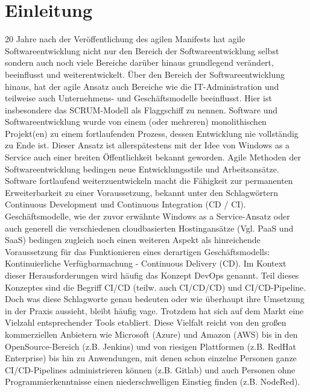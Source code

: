 \section{Einleitung}
\label{Einleitung}
20 Jahre nach der Veröffentlichung des agilen Manifests \cite{eckstein_20_2021} hat agile Softwareentwicklung nicht nur den Bereich der Softwareentwicklung selbst sondern auch noch viele Bereiche darüber hinaus grundlegend verändert, beeinflusst und weiterentwickelt. Über den Bereich der Softwareentwicklung hinaus, hat der agile Ansatz auch Bereiche wie die IT-Administration und teilweise auch Unternehmens- und Geschäftsmodelle beeinflusst. Hier ist insbesondere das \gls{SCRUM}-Modell als Flaggschiff zu nennen.
Software und Softwareentwicklung wurde von einem (oder mehreren) monolithischen Projekt(en) zu einem fortlaufenden Prozess, dessen Entwicklung nie vollständig zu Ende ist. Dieser Ansatz ist allerspätestens mit der Idee von \grqq{}Windows as a Service\glqq{} \cite{jaimeo_kurzanleitung_2021} auch einer breiten Öffentlichkeit bekannt geworden.\newline
Agile Methoden der Softwareentwicklung bedingen neue Entwicklungsstile und Arbeitsansätze. Software fortlaufend weiterzuentwickeln  macht die Fähigkeit zur permanenten Erweiterbarkeit zu einer Voraussetzung, bekannt unter den Schlagwörtern \glqq{} Continuous Development\grqq{} und \glqq{} Continuous Integration\grqq{}  (\acrshort{CD} / \acrshort{CI}). Geschäftsmodelle, wie der zuvor erwähnte \glqq{}Windows as a Service\grqq{}-Ansatz oder auch generell die verschiedenen cloudbasierten Hostingansätze (Vgl. \acrshort{PaaS} und \acrshort{SaaS}) bedingen zugleich noch einen weiteren Aspekt als hinreichende Voraussetzung für das Funktionieren eines derartigen Geschäftsmodells: Kontinuierliche Verfügbarmachung - \glqq{}Continuous Delivery\grqq{} (\acrshort{CD}).\newline
Im Kontext dieser Herausforderungen wird häufig das Konzept \glqq{}\gls{DevOps}\grqq{} genannt. Teil dieses Konzeptes sind die Begriff \acrshort{CI}/\acrshort{CD} (teilw. auch \acrshort{CI}/\acrshort{CD}/\acrshort{CD}) und \acrshort{CI}/\acrshort{CD}-Pipeline.
Doch was diese Schlagworte genau bedeuten oder wie überhaupt ihre Umsetzung in der Praxis aussieht, bleibt häufig vage. Trotzdem hat sich auf dem Markt eine Vielzahl entsprechender Tools etabliert.
Diese Vielfalt reicht von den großen kommerziellen Anbietern wie Microsoft (Azure) und Amazon (AWS) bis in den OpenSource-Bereich (z.B. Jenkins) und von riesigen Plattformen (z.B. RedHat Enterprise) bis hin zu Anwendungen, mit denen schon einzelne Personen ganze \acrshort{CI}/\acrshort{CD}-Pipelines administrieren können (z.B. Gitlab) und auch Personen ohne Programmierkenntnisse einen niederschwelligen Einstieg finden (z.B. NodeRed).